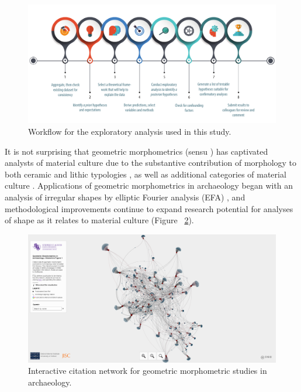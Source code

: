 \documentclass[review]{elsarticle}
\begin{document}
\begin{figure}[ht]\centering
\includegraphics[width=\linewidth]{fig04.pdf}
\caption{Workflow for the exploratory analysis used in this study.}
\label{fig:exan}
\end{figure}

It is not surprising that geometric morphometrics (sensu \citet{RN11559}) has captivated analysts of material culture due to the substantive contribution of morphology to both ceramic and lithic typologies \citep{RN11529,RN1752,RN11528,RN20853,RN11631,RN4335,RN11534}, as well as additional categories of material culture \citep{RN11543,RN1737,RN11544,RN4374,RN11527}. Applications of geometric morphometrics in archaeology began with an analysis of irregular shapes by elliptic Fourier analysis (EFA) \citep{RN4379}, and methodological improvements continue to expand research potential for analyses of shape as it relates to material culture (Figure ~\ref{fig:network}).

\begin{figure}[ht]\centering
\includegraphics[width=\linewidth]{fig05.png}
\caption{Interactive citation network for geometric morphometric studies in archaeology.}
\label{fig:network}
\end{figure}
\end{document}

